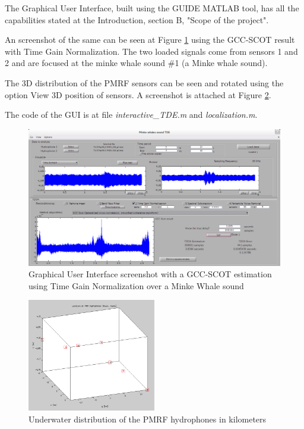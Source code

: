 The Graphical User Interface, built using the GUIDE MATLAB tool, has all the capabilities stated at the Introduction, section B, "Scope of the project".

An screenshot of the same can be seen at Figure \ref{fig:GUI} using the GCC-SCOT result with Time Gain Normalization. The two loaded signals come from sensors 1 and 2 and are focused at the minke whale sound \#1 (a Minke whale sound).

The 3D distribution of the PMRF sensors can be seen and rotated using the option View 3D position of sensors. A screenshot is attached at Figure \ref{fig:3D_sensors}.

The code of the GUI is at file \emph{interactive\_TDE.m}\cite{interactiveTDE.m} and \emph{localization.m}\cite{localization.m}.

\begin{figure}[!t]
	\begin{center}
		\includegraphics[width=1\textwidth]{figures/GUI_SCOT.png}
	\end{center}
	\caption{Graphical User Interface screenshot with a GCC-SCOT estimation using Time Gain Normalization over a Minke Whale sound}
	\label{fig:GUI}
\end{figure}

\begin{figure}[htb]
	\begin{center}
		\includegraphics[width=0.5\textwidth]{figures/3D_sensors.png}
	\end{center}
	\caption{Underwater distribution of the PMRF hydrophones in kilometers}
	\label{fig:3D_sensors}
\end{figure}
